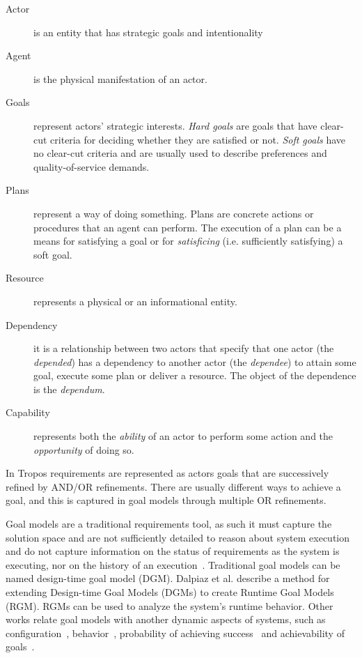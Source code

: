 \begin{description}%
  \item[Actor] is an entity that has strategic goals and intentionality

  \item[Agent] is the physical manifestation of an actor.

  \item[Goals] represent actors’ strategic interests. \emph{Hard goals} are goals that have clear-cut criteria for deciding whether they are satisfied or not. \emph{Soft goals} have no clear-cut criteria and are usually used to describe preferences and quality-of-service demands.

  \item[Plans] represent a way of doing something. Plans are concrete actions or procedures that an agent can perform. The execution of a plan can be a means for satisfying a goal or for \emph{satisficing} (i.e. sufficiently satisfying) a soft goal.

  \item[Resource] represents a physical or an informational entity.

  \item[Dependency] it is a relationship between two actors that specify that one actor (the \emph{depended}) has a dependency to another actor (the \emph{dependee}) to attain some goal, execute some plan or deliver a resource. The object of the dependence is the \emph{dependum}.

  \item[Capability] represents both the \emph{ability} of an actor to perform some action and the \emph{opportunity} of doing so.

\end{description}


In Tropos requirements are represented as actors goals that are successively refined by AND/OR refinements. There are usually different ways to achieve a goal, and this is captured in goal models through multiple OR refinements.

Goal models are a traditional requirements tool, as such it must capture the solution space and are not sufficiently detailed to reason about system execution and do not capture information on the status of requirements as the system is executing, nor on the history of an execution~\cite{borgida_requirements_2013}. Traditional goal models can be named design-time goal model (DGM). Dalpiaz et al.\cite{dalpiaz_runtime_2013} describe a method for extending Design-time Goal Models (DGMs) to create Runtime Goal Models (RGM). RGMs can be used to analyze the system's runtime behavior. Other works relate goal models with another dynamic aspects of systems, such as configuration~\cite{yu_goals_2008}, behavior~\cite{dalpiaz_runtime_2013},  probability of achieving success~\cite{mendonca_dependability_2015} and achievability of goals~\cite{pontes_guimaraes_pragmatic_2015}.

